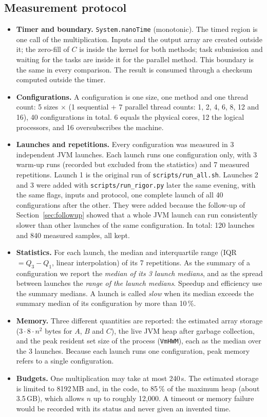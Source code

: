 \documentclass[11pt,a4paper]{article}
\newcommand{\code}[1]{\texttt{#1}}
\begin{document}
\subsection{Measurement protocol}

\begin{itemize}
  \item \textbf{Timer and boundary.} \code{System.nanoTime} (monotonic). The timed region is one call of the multiplication. Inputs and the output array are created outside it; the zero-fill of $C$ is inside the kernel for both methods; task submission and waiting for the tasks are inside it for the parallel method. This boundary is the same in every comparison. The result is consumed through a checksum computed outside the timer.
  \item \textbf{Configurations.} A configuration is one size, one method and one thread count: 5 sizes $\times$ (1 sequential + 7 parallel thread counts: 1, 2, 4, 6, 8, 12 and 16), 40 configurations in total. 6 equals the physical cores, 12 the logical processors, and 16 oversubscribes the machine.
  \item \textbf{Launches and repetitions.} Every configuration was measured in 3 independent JVM launches. Each launch runs one configuration only, with 3 warm-up runs (recorded but excluded from the statistics) and 7 measured repetitions. Launch 1 is the original run of \code{scripts/run\_all.sh}. Launches 2 and 3 were added with \code{scripts/run\_rigor.py} later the same evening, with the same flags, inputs and protocol, one complete launch of all 40 configurations after the other. They were added because the follow-up of Section~\ref{sec:followup} showed that a whole JVM launch can run consistently slower than other launches of the same configuration. In total: 120 launches and 840 measured samples, all kept.
  \item \textbf{Statistics.} For each launch, the median and interquartile range (IQR $= Q_3 - Q_1$, linear interpolation) of its 7 repetitions. As the summary of a configuration we report the \emph{median of its 3 launch medians}, and as the spread between launches the \emph{range of the launch medians}. Speedup and efficiency use the summary medians. A launch is called \emph{slow} when its median exceeds the summary median of its configuration by more than 10\,\%.
  \item \textbf{Memory.} Three different quantities are reported: the estimated array storage ($3\cdot 8\cdot n^2$ bytes for $A$, $B$ and $C$), the live JVM heap after garbage collection, and the peak resident set size of the process (\code{VmHWM}), each as the median over the 3 launches. Because each launch runs one configuration, peak memory refers to a single configuration.
  \item \textbf{Budgets.} One multiplication may take at most 240\,s. The estimated storage is limited to 8192\,MB and, in the code, to 85\,\% of the maximum heap (about 3.5\,GB), which allows $n$ up to roughly 12,000. A timeout or memory failure would be recorded with its status and never given an invented time.
\end{itemize}
\end{document}
